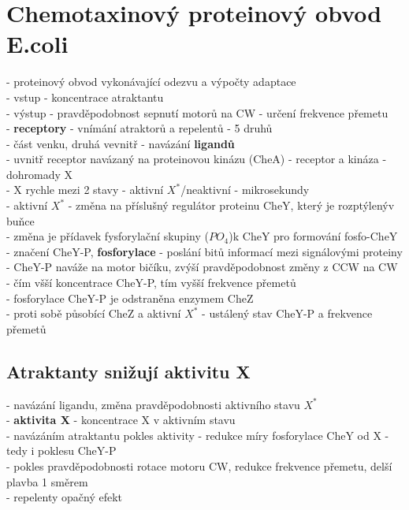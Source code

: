\documentclass[11pt,a4paper]{report}
\begin{document}
\section{Chemotaxinový proteinový obvod E.coli}
- proteinový obvod vykonávající odezvu a výpočty adaptace\\
\indent - vstup - koncentrace atraktantu\\
\indent - výstup - pravděpodobnost sepnutí motorů na CW - určení frekvence přemetu\\
- \textbf{receptory} - vnímání atraktorů a repelentů - 5 druhů\\
\indent - část venku, druhá vevnitř - navázání \textbf{ligandů}\\ 
\indent - uvnitř receptor navázaný na proteinovou kinázu (CheA) - receptor a kináza - dohromady X\\
\indent \indent - X rychle mezi 2 stavy - aktivní $X^*$/neaktivní - mikrosekundy\\
\indent - aktivní $X^*$ - změna na příslušný regulátor proteinu CheY, který je rozptýlenýv buňce\\
\indent \indent - změna je přídavek fysforylační skupiny ($PO_4$)k CheY pro formování fosfo-CheY\\
\indent \indent - značení CheY-P, \textbf{fosforylace} - poslání bitů informací mezi signálovými proteiny\\
\indent \indent - CheY-P naváže na motor bičíku, zvýší pravděpodobnost změny z CCW na CW\\
\indent \indent \indent - čím všší koncentrace CheY-P, tím vyšší frekvence přemetů\\
\indent \indent - fosforylace CheY-P je odstraněna enzymem CheZ\\
\indent \indent \indent - proti sobě působící CheZ a aktivní $X^*$ - ustálený stav CheY-P a frekvence přemetů\\

\subsection{Atraktanty snižují aktivitu X}
- navázání ligandu, změna pravděpodobnosti aktivního stavu $X^*$\\
- \textbf{aktivita X} - koncentrace X v aktivním stavu\\
- navázáním atraktantu pokles aktivity - redukce míry fosforylace CheY od X - tedy i poklesu CheY-P\\
\indent - pokles pravděpodobnosti rotace motoru CW, redukce frekvence přemetu, delší plavba 1 směrem\\
\indent - repelenty opačný efekt\\
\end{document}
